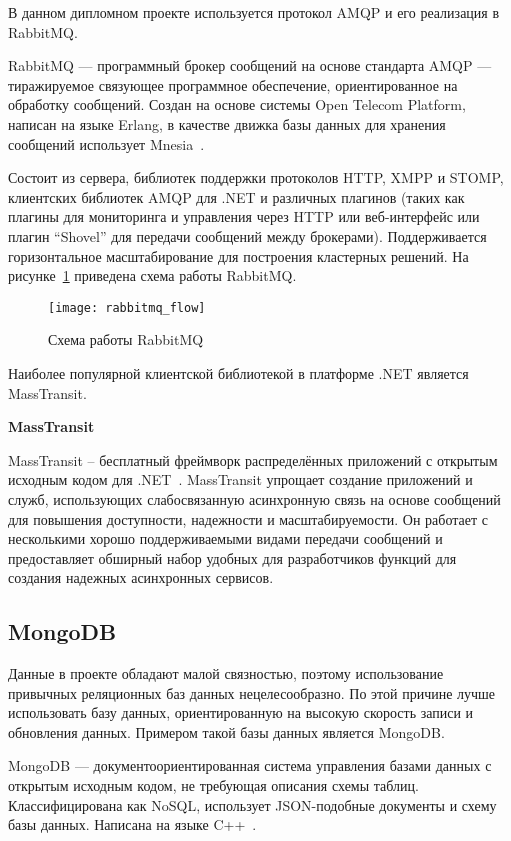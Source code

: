 В данном дипломном проекте используется протокол AMQP и его реализация в RabbitMQ.

RabbitMQ — программный брокер сообщений на основе стандарта AMQP — тиражируемое связующее программное обеспечение, ориентированное на обработку сообщений. Создан на основе системы Open Telecom Platform, написан на языке Erlang, в качестве движка базы данных для хранения сообщений использует Mnesia~\cite{rabbitmq}.

Состоит из сервера, библиотек поддержки протоколов HTTP, XMPP и STOMP, клиентских библиотек AMQP для .NET и различных плагинов (таких как плагины для мониторинга и управления через HTTP или веб-интерфейс или плагин ``Shovel'' для передачи сообщений между брокерами). Поддерживается горизонтальное масштабирование для построения кластерных решений. На рисунке~\ref{fig:rabbitmq_flow} приведена схема работы RabbitMQ.

\begin{figure}[ht]
    \centering
    \texttt{[image: rabbitmq\_flow]}
    \caption{Схема работы RabbitMQ}\label{fig:rabbitmq_flow}
\end{figure}

Наиболее популярной клиентской библиотекой в платформе .NET является MassTransit.

\bigskip
\textbf{MassTransit}

MassTransit – бесплатный фреймворк распределённых приложений с открытым исходным кодом для .NET~\cite{mass_transit}. MassTransit упрощает создание приложений и служб, использующих слабосвязанную асинхронную связь на основе сообщений для повышения доступности, надежности и масштабируемости. Он работает с несколькими хорошо поддерживаемыми видами передачи сообщений и предоставляет обширный набор удобных для разработчиков функций для создания надежных асинхронных сервисов.


\subsection{MongoDB}

Данные в проекте обладают малой связностью, поэтому использование привычных реляционных баз данных нецелесообразно. По этой причине лучше использовать базу данных, ориентированную на высокую скорость записи и обновления данных. Примером такой базы данных является MongoDB.

MongoDB — документоориентированная система управления базами данных с открытым исходным кодом, не требующая описания схемы таблиц. Классифицирована как NoSQL, использует JSON-подобные документы и схему базы данных. Написана на языке C++~\cite{mongo}.

